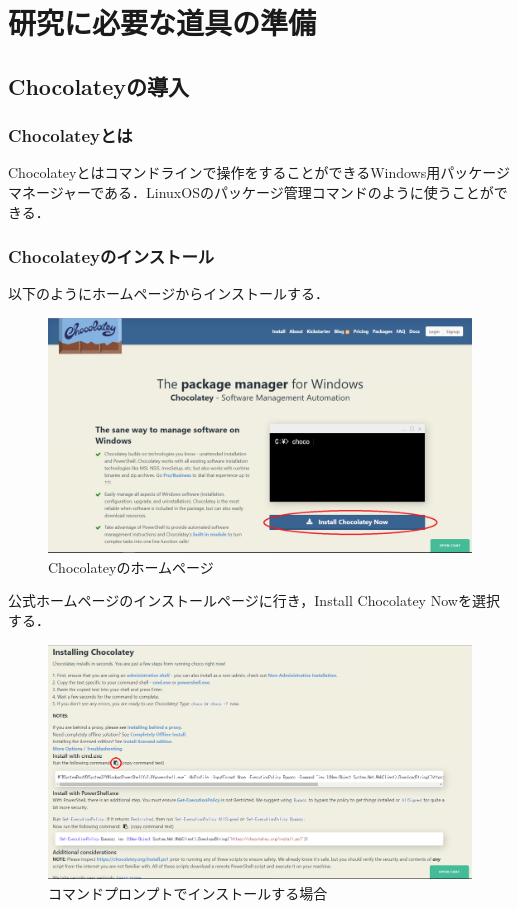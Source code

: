 \section{研究に必要な道具の準備}
\subsection{Chocolateyの導入}


\subsubsection{Chocolateyとは}
Chocolateyとはコマンドラインで操作をすることができるWindows用パッケージマネージャーである．LinuxOSのパッケージ管理コマンドのように使うことができる．

\subsubsection{Chocolateyのインストール}
以下のようにホームページからインストールする．

\begin{figure}[h]
\centering
\includegraphics[width=13cm,clip]{chocolatey1.PNG}
\caption{Chocolateyのホームページ}
\end{figure}

公式ホームページのインストールページに行き，Install Chocolatey Nowを選択する．

\newpage
\begin{figure}[h]
\centering
\includegraphics[width=13cm,clip]{chocolatey2.PNG}
\caption{コマンドプロンプトでインストールする場合}
\end{figure}


